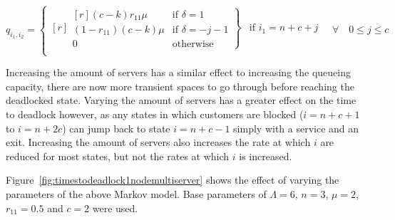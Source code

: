 \documentclass{article}
\begin{document}
\begin{equation}
  q_{i_1, i_2} = \left\{
  \begin{matrix*}[ r ]
    \left. \begin{matrix*}[ r ]
      (c-k)r_{11}\mu & \text{if } \delta = 1 \\
      (1-r_{11})(c-k)\mu & \text{if } \delta = -j-1\\
      0 & \text{otherwise}
    \end{matrix*} \right\} & \text{if } i_1 = n + c + j \\
  \end{matrix*} \right.
  \quad \forall \quad 0 \leq j \leq c
\end{equation}

Increasing the amount of servers has a similar effect to increasing the queueing capacity, there are now more transient spaces to go through before reaching the deadlocked state.
Varying the amount of servers has a greater effect on the time to deadlock however, as any states in which customers are blocked ($i=n+c+1$ to $i=n+2c$) can jump back to state $i=n+c-1$ simply with a service and an exit.
Increasing the amount of servers also increases the rate at which $i$ are reduced for most states, but not the rates at which $i$ is increased.

Figure~\ref{fig:timestodeadlock1nodemultiserver} shows the effect of varying the parameters of the above Markov model.
Base parameters of $\Lambda = 6$, $n = 3$, $\mu = 2$, $r_{11} = 0.5$ and $c = 2$ were used.
\end{document}
